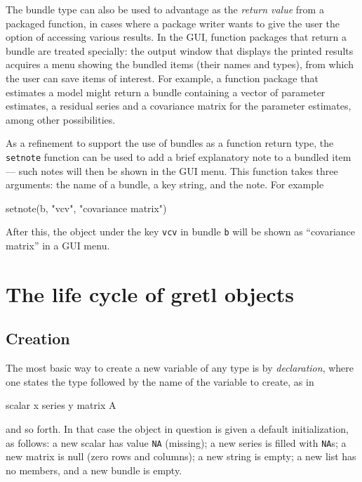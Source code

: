 The bundle type can also be used to advantage as the \textit{return
  value} from a packaged function, in cases where a package writer
wants to give the user the option of accessing various results. In the
 GUI, function packages that return a bundle are treated
specially: the output window that displays the printed results
acquires a menu showing the bundled items (their names and types),
from which the user can save items of interest. For example, a
function package that estimates a model might return a bundle 
containing a vector of parameter estimates, a residual series and a
covariance matrix for the parameter estimates, among other
possibilities.

As a refinement to support the use of bundles as a function return
type, the \texttt{setnote} function can be used to add a brief
explanatory note to a bundled item --- such notes will then be shown
in the GUI menu.  This function takes three arguments: the name of a
bundle, a key string, and the note. For example

\begin{code}
setnote(b, "vcv", "covariance matrix")
\end{code}

After this, the object under the key \texttt{vcv} in bundle \texttt{b}
will be shown as ``covariance matrix'' in a GUI menu.

\section{The life cycle of gretl objects}

\subsection{Creation}

The most basic way to create a new variable of any type is by
\textit{declaration}, where one states the type followed by the name
of the variable to create, as in

\begin{code}
scalar x
series y
matrix A
\end{code}

and so forth. In that case the object in question is given a default
initialization, as follows: a new scalar has value \texttt{NA}
(missing); a new series is filled with \texttt{NA}s; a new matrix is
null (zero rows and columns); a new string is empty; a new list has no
members, and a new bundle is empty.

